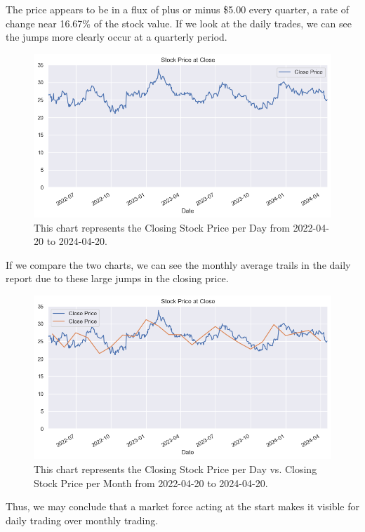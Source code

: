 \documentclass[9pt,a4paper,twoside]{tau}
\begin{document}
        The price appears to be in a flux of plus or minus \$5.00 every quarter, a rate of change near 16.67\% of the stock value. If we look at the daily trades, we can see the jumps more clearly occur at a quarterly period. 
            \begin{figure}[H]
                \centering
                \includegraphics[width=0.85\columnwidth]{images/CloseDataSet1d.png}
                \caption{This chart represents the Closing Stock Price per Day from 2022-04-20 to 2024-04-20.}
                \label{fig:figure}
            \end{figure}
        
        If we compare the two charts, we can see the monthly average trails in the daily report due to these large jumps in the closing price.
            \begin{figure}[H]
                \centering
                \includegraphics[width=0.85\columnwidth]{images/CloseDataSet1dvs1mo.png}
                \caption{This chart represents the Closing Stock Price per Day vs. Closing Stock Price per Month from 2022-04-20 to 2024-04-20.}
                \label{fig:figure}
            \end{figure}
        
        Thus, we may conclude that a market force acting at the start makes it visible for daily trading over monthly trading.
        
\end{document}
